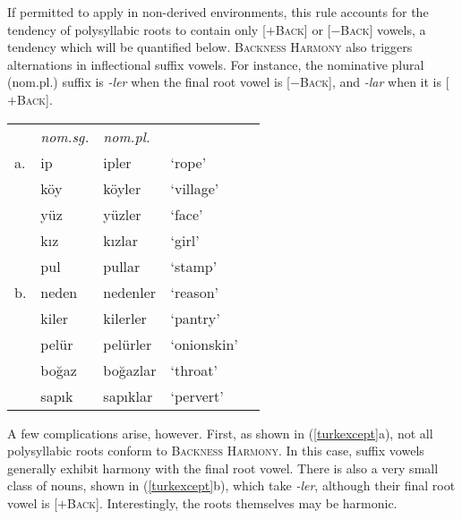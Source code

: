 If permitted to apply in non-derived environments, this rule accounts for the tendency of polysyllabic roots to contain only [$+$\textsc{Back}] or [$-$\textsc{Back}] vowels, a tendency which will be quantified below. \textsc{Backness Harmony} also triggers alternations in inflectional suffix vowels. For instance, the nominative plural (nom.pl.) suffix is \emph{-ler} when the final root vowel is [$-$\textsc{Back}], and \emph{-lar} when it is [$+$\textsc{Back}].

\begin{example}
\label{turknom}
\begin{tabular}{lllll}
   & \emph{nom.sg.} & \emph{nom.pl.} \\
a. & {ip}           & {ipler}    & `rope'         & \citep[][216]{Clements1982} \\
   & {köy}          & {köyler}   & `village'      \\
   & {yüz}          & {yüzler}   & `face'         \\
   & {kız}          & {kızlar}   & `girl'         \\
   & {pul}          & {pullar}   & `stamp'        \\
b. & {neden}        & {nedenler} & `reason'       & \citep{TELL} \\
   & {kiler}        & {kilerler} & `pantry'       \\
   & {pelür}        & {pelürler} & `onionskin'    \\
   & {boğaz}        & {boğazlar} & `throat'       \\
   & {sapık}        & {sapıklar} & `pervert'      \\
\end{tabular}
\end{example}

A few complications arise, however. First, as shown in (\ref{turkexcept}a), not all polysyllabic roots conform to \textsc{Backness Harmony}. In this case, suffix vowels generally exhibit harmony with the final root vowel. There is also a very small class of nouns, shown in (\ref{turkexcept}b), which take \emph{-ler}, although their final root vowel is [$+$\textsc{Back}]. Interestingly, the roots themselves may be harmonic.

